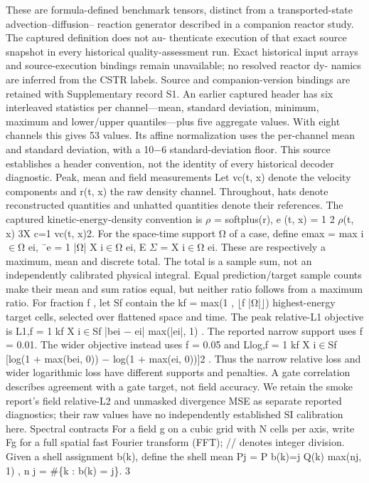 \documentclass[11pt]{article}
\begin{document}
These are formula-defined benchmark tensors, distinct from a transported-state advection–diffusion–
reaction generator described in a companion reactor study. The captured definition does not au-
thenticate execution of that exact source snapshot in every historical quality-assessment run. Exact
historical input arrays and source-execution bindings remain unavailable; no resolved reactor dy-
namics are inferred from the CSTR labels. Source and companion-version bindings are retained
with Supplementary record S1.
An earlier captured header has six interleaved statistics per channel—mean, standard deviation,
minimum, maximum and lower/upper quantiles—plus five aggregate values. With eight channels
this gives 53 values. Its affine normalization uses the per-channel mean and standard deviation,
with a 10\ensuremath{-}6 standard-deviation floor. This source establishes a header convention, not the identity
of every historical decoder diagnostic.
Peak, mean and field measurements
Let vc(t, x) denote the velocity components and r(t, x) the raw density channel. Throughout, hats
denote reconstructed quantities and unhatted quantities denote their references. The captured
kinetic-energy-density convention is
\ensuremath{\rho} = softplus(r), e (t, x) = 1
2 \ensuremath{\rho}(t, x)
3X
c=1
vc(t, x)2.
For the space-time support Ω of a case, define
emax = max
i\ensuremath{\in}Ω
ei, ¯e = 1
|Ω|
X
i\ensuremath{\in}Ω
ei, E \ensuremath{\Sigma} =
X
i\ensuremath{\in}Ω
ei.
These are respectively a maximum, mean and discrete total. The total is a sample sum, not an
independently calibrated physical integral. Equal prediction/target sample counts make their mean
and sum ratios equal, but neither ratio follows from a maximum ratio.
For fraction f , let Sf contain the kf = max(1 , \ensuremath{\lfloor}f |Ω|\ensuremath{\rfloor}) highest-energy target cells, selected over
flattened space and time. The peak relative-L1 objective is
L1,f = 1
kf
X
i\ensuremath{\in}Sf
|bei \ensuremath{-} ei|
max(|ei|, 1) .
The reported narrow support uses f = 0.01. The wider objective instead uses f = 0.05 and
Llog,f = 1
kf
X
i\ensuremath{\in}Sf
[log(1 + max(bei, 0)) \ensuremath{-} log(1 + max(ei, 0))]2 .
Thus the narrow relative loss and wider logarithmic loss have different supports and penalties. A
gate correlation describes agreement with a gate target, not field accuracy. We retain the smoke
report’s field relative-L2 and unmasked divergence MSE as separate reported diagnostics; their raw
values have no independently established SI calibration here.
Spectral contracts
For a field g on a cubic grid with N cells per axis, write Fg for a full spatial fast Fourier transform
(FFT); // denotes integer division. Given a shell assignment b(k), define the shell mean
Pj =
P
b(k)=j Q(k)
max(nj, 1) , n j = \#\{k : b(k) = j\}.
3
\end{document}
